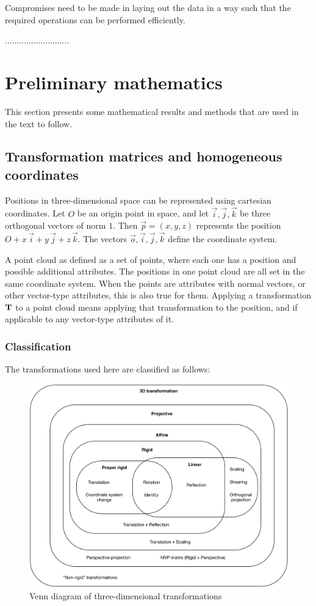 Compromises need to be made in laying out the data in a way such that the required operations can be performed efficiently. 

...........................


\section{Preliminary mathematics}
This section presents some mathematical results and methods that are used in the text to follow.

\subsection{Transformation matrices and homogeneous coordinates}
Positions in three-dimensional space can be represented using cartesian coordinates. Let $O$ be an origin point in space, and let $\vec{i}, \vec{j}, \vec{k}$ be three orthogonal vectors of norm $1$. Then $\vec{p} = (x, y, z)$ represents the position $O + x \, \vec{i} + y \, \vec{j} + z \, \vec{k}$. The vectors $\vec{o}, \vec{i}, \vec{j}, \vec{k}$ define the coordinate system.

A point cloud as defined as a set of points, where each one has a position and possible additional attributes. The positions in one point cloud are all set in the same coordinate system. When the points are attributes with normal vectors, or other vector-type attributes, this is also true for them. Applying a transformation $\mathbf{T}$ to a point cloud means applying that transformation to the position, and if applicable to any vector-type attributes of it.

\subsubsection{Classification}
The transformations used here are classified as follows:

\begin{figure}[h]
\center
\includegraphics[width=.8\textwidth]{fig/transformations_venn.pdf}
\caption{Venn diagram of three-dimensional transformations}
\end{figure}

